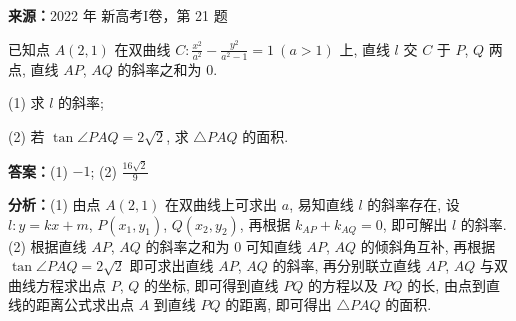 \begin{question}[points=12]
\textbf{来源：}2022 年 新高考I卷，第 21 题\par
已知点 $A(2,1)$ 在双曲线 $C: \frac{x^2}{a^2} - \frac{y^2}{a^2-1} = 1\ (a>1)$ 上, 直线 $l$ 交 $C$ 于 $P$, $Q$ 两点, 直线 $AP$, $AQ$ 的斜率之和为 $0$.

(1) 求 $l$ 的斜率;

(2) 若 $\tan\angle PAQ = 2\sqrt{2}$, 求 $\triangle PAQ$ 的面积.
\begin{solution}
\textbf{答案：}(1) $-1$; (2) $\frac{16\sqrt{2}}{9}$

\textbf{分析：}(1) 由点 $A(2,1)$ 在双曲线上可求出 $a$, 易知直线 $l$ 的斜率存在, 设 $l: y = kx + m$, $P(x_1, y_1)$, $Q(x_2, y_2)$, 再根据 $k_{AP} + k_{AQ} = 0$, 即可解出 $l$ 的斜率. (2) 根据直线 $AP$, $AQ$ 的斜率之和为 $0$ 可知直线 $AP$, $AQ$ 的倾斜角互补, 再根据 $\tan\angle PAQ = 2\sqrt{2}$ 即可求出直线 $AP$, $AQ$ 的斜率, 再分别联立直线 $AP$, $AQ$ 与双曲线方程求出点 $P$, $Q$ 的坐标, 即可得到直线 $PQ$ 的方程以及 $PQ$ 的长, 由点到直线的距离公式求出点 $A$ 到直线 $PQ$ 的距离, 即可得出 $\triangle PAQ$ 的面积.


\end{solution}
\end{question}
